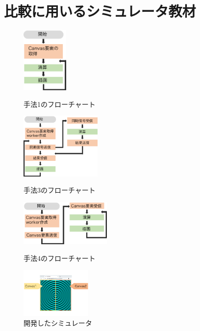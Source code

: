 \documentclass[twocolumn,10pt,a4j]{jsarticle}
\begin{document}
\section{比較に用いるシミュレータ教材}
\begin{figure}[b]
\vspace{-5mm}
 \begin{minipage}{0.49\hsize}
  \centering
  \vspace{-10mm}
   \includegraphics[width=23mm]{cpu_chart.pdf}
   \vspace{10pt}
  \caption{手法1のフローチャート}
  \label{fig:cpu}
 \end{minipage} 
 \begin{minipage}{0.5\hsize}
 \centering
  \vspace{5pt}	
  \includegraphics[width=40mm]{worker_chart2.pdf}
     \belowcaptionskip=25pt
  \abovecaptionskip=5pt
  \caption{手法3のフローチャート}
  \label{fig:worker}
 \end{minipage}
 
 \begin{minipage}{0.5\hsize}
 \centering
 \vspace{-25pt}	
  \includegraphics[width=45mm  ]{offsc_chart2.pdf}
  \abovecaptionskip=30pt
  \belowcaptionskip=-10pt
  \caption{手法4のフローチャート}
  \label{fig:offsc}
 \end{minipage}
 \begin{minipage}{0.49\hsize}
 \vspace{-14mm}
  \centering
   \includegraphics[width=35mm , angle=-90]{sim.pdf}
   \vspace{15pt}
  \caption{開発したシミュレータ}
  \label{fig:sim}
 \end{minipage}
\end{figure}
\end{document}

